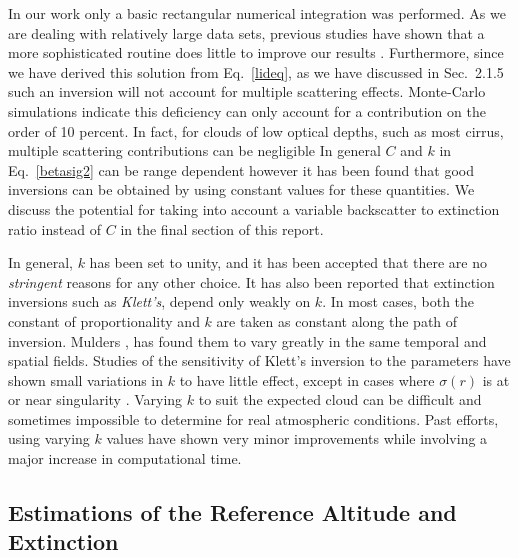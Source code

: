 In our work only a basic rectangular numerical integration was performed. 
As we are dealing with relatively large data sets, previous studies 
have shown that a more sophisticated routine 
does little to improve our results \cite{agc}.
Furthermore, since we have derived this solution from
Eq.~{\ref{lideq}}, as we have discussed in Sec.~{2.1.5}
such an inversion will not account for
multiple scattering effects. Monte-Carlo 
simulations indicate this deficiency can only account for a 
contribution on the order of 10 percent. In fact, for clouds of
low optical depths, such as most cirrus, 
multiple scattering contributions can be negligible \cite{cmrpacd2} 
In general $C$ and $k$ in Eq.~{\ref{betasig2}} can be range dependent however
it has been found that good inversions can be obtained by using constant
values for these quantities. We discuss the potential for taking into
account a variable backscatter to extinction ratio instead of
$C$ in the final section of this report.

In general, $k$ has been set to unity,
and it has been accepted that there are no {\em stringent} reasons
for any other choice. It has also been reported that extinction
inversions such as {\em Klett's}, depend only weakly on $k$.\cite{wcrr}
In most cases, both the constant of proportionality and
$k$ are taken as constant along the path of inversion.
Mulders \cite{jmm}, has found them to 
vary greatly in the same temporal and spatial fields.
Studies of the sensitivity of Klett's inversion to the parameters
have shown small variations in $k$ to have little effect,
except in cases where $\sigma(r)$ is at or near singularity \cite{hghjafdhs}.
Varying $k$ to suit the expected cloud can be difficult
and sometimes impossible to determine for real atmospheric conditions.
%
Past efforts, using varying $k$ values have shown very minor improvements
while involving a major increase in computational time. \cite{agc}
% 
\subsection{Estimations of the Reference Altitude and Extinction}

